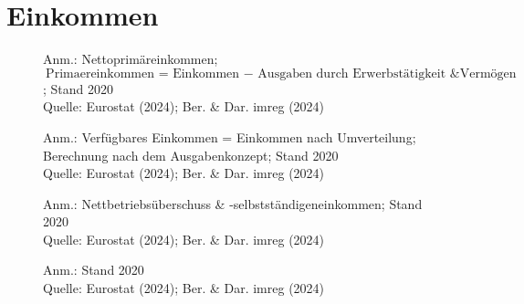 

\section{Einkommen}


\begin{figure}[p]
	{\centering {}}
	\label{map:einkommenprim}
	\begin{spacing}{1} \scriptsize
		Anm.: Nettoprimäreinkommen; $\text{Primaereinkommen = Einkommen $-$ Ausgaben durch Erwerbstätigkeit \& Vermögen}$; Stand 2020\\
		Quelle: Eurostat (2024); Ber. \& Dar. imreg (2024) \end{spacing}
\end{figure}


\begin{figure}[p]
	{\centering {}}
	\label{map:einkommenverf}
	\begin{spacing}{1} \scriptsize
		Anm.: Verfügbares Einkommen = Einkommen nach Umverteilung; Berechnung nach dem Ausgabenkonzept; Stand 2020\\
		Quelle: Eurostat (2024); Ber. \& Dar. imreg (2024) \end{spacing}
\end{figure}


\begin{figure}[p]
	{\centering {}}
	\label{map:einkommenbetrieb}
	\begin{spacing}{1} \scriptsize
		Anm.: Nettbetriebsüberschuss \& -selbstständigeneinkommen; Stand 2020\\
		Quelle: Eurostat (2024); Ber. \& Dar. imreg (2024) \end{spacing}
\end{figure}


\begin{figure}[p]
	{\centering {}}
	\label{map:einkommenarbeit}
	\begin{spacing}{1} \scriptsize
		Anm.: Stand 2020\\
		Quelle: Eurostat (2024); Ber. \& Dar. imreg (2024) \end{spacing}
\end{figure}


